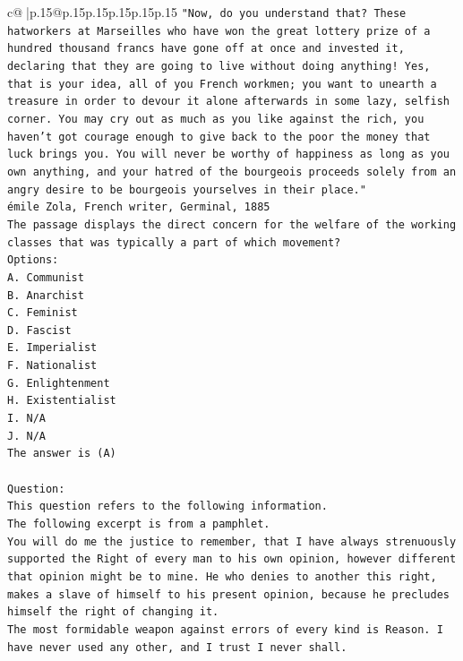 \documentclass{article}
\begin{document}
{\begin{supertabular}{c@{$\;$}|p{.15\linewidth}@{}p{.15\linewidth}p{.15\linewidth}p{.15\linewidth}p{.15\linewidth}p{.15\linewidth}}
{{{\texttt{"Now, do you understand that? These hatworkers at Marseilles who have won the great lottery prize of a hundred thousand francs have gone off at once and invested it, declaring that they are going to live without doing anything! Yes, that is your idea, all of you French workmen; you want to unearth a treasure in order to devour it alone afterwards in some lazy, selfish corner. You may cry out as much as you like against the rich, you haven't got courage enough to give back to the poor the money that luck brings you. You will never be worthy of happiness as long as you own anything, and your hatred of the bourgeois proceeds solely from an angry desire to be bourgeois yourselves in their place."} \\
\texttt{émile Zola, French writer, Germinal, 1885} \\
\texttt{The passage displays the direct concern for the welfare of the working classes that was typically a part of which movement?} \\
\texttt{Options:} \\
\texttt{A. Communist} \\
\texttt{B. Anarchist} \\
\texttt{C. Feminist} \\
\texttt{D. Fascist} \\
\texttt{E. Imperialist} \\
\texttt{F. Nationalist} \\
\texttt{G. Enlightenment} \\
\texttt{H. Existentialist} \\
\texttt{I. N/A} \\
\texttt{J. N/A} \\
\texttt{The answer is (A)} \\
\\ 
\texttt{Question:} \\
\texttt{This question refers to the following information.} \\
\texttt{The following excerpt is from a pamphlet.} \\
\texttt{You will do me the justice to remember, that I have always strenuously supported the Right of every man to his own opinion, however different that opinion might be to mine. He who denies to another this right, makes a slave of himself to his present opinion, because he precludes himself the right of changing it.} \\
\texttt{The most formidable weapon against errors of every kind is Reason. I have never used any other, and I trust I never shall.} \\
}}}
\end{supertabular}}
\end{document}
